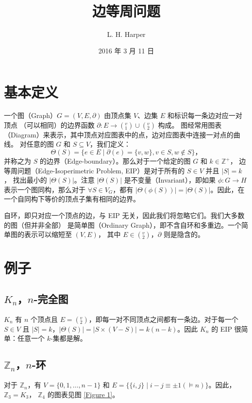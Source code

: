 \documentclass[12pt, a4paper]{article}
\author{L. H. Harper}
\date{2016 年 3 月 11 日}
\begin{document}
\title{边等周问题}
\maketitle

\section{基本定义}
\label{Section 1}

一个图（Graph）$G = (V, E, \partial)$ 由顶点集 $V$、边集 $E$ 和标识每一条边对应一对顶点
（可以相同）的边界函数 $\partial \colon E \rightarrow (_1^v) \cup (_2^v)$ 构成。
图经常用图表（Diagram）来表示，其中顶点对应图表中的点，边对应图表中连接一对点的曲线。
对任意的图 $G$ 和 $S \subseteq V$，我们定义：
$$\Theta(S) = \{e \in E \mid \partial(e) = \{v, w\}, v \in S, w \notin S\}，$$
并称之为 $S$ 的边界（Edge-boundary）。那么对于一个给定的图 $G$ 和 $k \in \mathbb{Z}^+$，
边等周问题（Edge-Isoperimetric Problem, EIP）是对于所有的 $S \in V$ 并且 $|S| = k$，
找出最小的 $|\Theta(S)|$。注意 $|\Theta(S)|$ 是不变量（Invariant），即如果
$\phi \colon G \rightarrow H$ 表示一个图同构，那么对于 $\forall S \in V_G$，都有
$|\Theta(\phi(S))| = |\Theta(S)|$。因此，在一个自同构下等价的顶点子集有相同的边界。

自环，即只对应一个顶点的边，与 EIP 无关，因此我们将忽略它们。我们大多数的图（但并非全部）
是简单图（Ordinary Graph），即不含自环和多重边。一个简单图的表示可以缩短至 $(V, E)$，
其中 $E \in (_2^v)$，$\partial$ 则是隐含的。

\section{例子}
\label{Section 2}

\subsection{$K_n$，$n$-完全图}
\label{Subsection 2.1}

$K_n$ 有 $n$ 个顶点且 $E = (_2^v)$，即每一对不同顶点之间都有一条边。对于每一个 $S \in V$
且 $|S| = k$，$|\Theta(S)| = |S \times (V − S)| = k(n − k)$。因此 $K_n$ 的 EIP
很简单：任意一个 $k$-集都是解。

\subsection{$\mathbb{Z}_n$，$n$-环}
\label{Subsection 2.2}

对于 $\mathbb{Z}_n$，有 $V = \{0, 1, \dots, n − 1\}$ 和
$E = \{\{i, j\} \mid i − j \equiv  \pm 1(\models n)\}$。因此，$\mathbb{Z}_3 = K_3$，
$\mathbb{Z}_4$ 的图表见图 \ref{Figure 1}。
\end{document}
